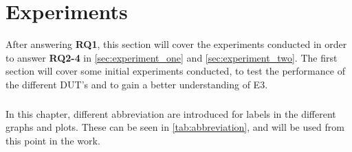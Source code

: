 \chapter{Experiments}\label{ch:experiments}

After answering \textbf{RQ1}, this section will cover the experiments conducted in order to answer  \textbf{RQ2-4} in \cref{sec:experiment_one} and \cref{sec:experiment_two}. The first section will cover some initial experiments conducted, to test the performance of the different DUT's and to gain a better understanding of E3.


\paragraph*{}
In this chapter, different abbreviation are introduced for labels in the different graphs and plots. These can be seen in \cref{tab:abbreviation}, and will be used from this point in the work.






